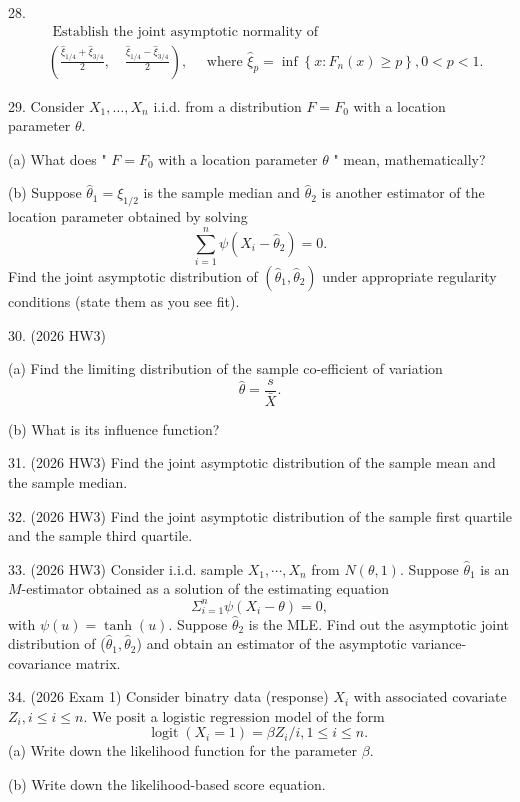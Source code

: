 \documentclass[11pt]{article}
\theoremstyle{definition}
\begin{document}
28.
$$
\begin{aligned}
&\text { Establish the joint asymptotic normality of }\\
&\left(\frac{\hat{\xi}_{1 / 4}+\hat{\xi}_{3 / 4}}{2}, \quad \frac{\hat{\xi}_{1 / 4}-\hat{\xi}_{3 / 4}}{2}\right), \quad \text { where } \hat{\xi}_p=\inf \left\{x: F_n(x) \geq p\right\}, 0<p<1 .
\end{aligned}
$$

29. Consider $X_1, \ldots, X_n$ i.i.d. from a distribution $F=F_0$ with a location parameter $\theta$.

(a) What does " $F=F_0$ with a location parameter $\theta$ " mean, mathematically?

(b) Suppose $\hat{\theta}_1=\xi_{1 / 2}$ is the sample median and $\hat{\theta}_2$ is another estimator of the location parameter obtained by solving
$$
\sum_{i=1}^n \psi\left(X_i-\hat{\theta}_2\right)=0 .
$$
Find the joint asymptotic distribution of $\left(\hat{\theta}_1, \hat{\theta}_2\right)$ under appropriate regularity conditions (state them as you see fit).

30. (2026 HW3) 

(a) Find the limiting distribution of the sample co-efficient of variation
$$
\widehat{\theta}=\frac{s}{\bar{X}} .
$$

(b) What is its influence function?

31. (2026 HW3) Find the joint asymptotic distribution of the sample mean and the sample median.

32. (2026 HW3) Find the joint asymptotic distribution of the sample first quartile and the sample third quartile.

33. (2026 HW3) Consider i.i.d. sample $X_1, \cdots, X_n$ from $N(\theta, 1)$. Suppose $\widehat{\theta}_1$ is an $M$-estimator obtained as a solution of the estimating equation
$$
\Sigma_{i=1}^n \psi\left(X_i-\theta\right)=0,
$$
with $\psi(u)=\tanh (u)$. Suppose $\widehat{\theta}_2$ is the MLE.
Find out the asymptotic joint distribution of ($\widehat{\theta}_1, \widehat{\theta}_2$) and obtain an estimator of the asymptotic variance-covariance matrix.

34. (2026 Exam 1) Consider binatry data (response) $X_i$ with associated covariate $Z_i, i \leq i \leq n$. We posit a logistic regression model of the form
$$
\operatorname{logit}\left(X_i=1\right)=\beta Z_i / i, 1 \leq i \leq n \text {. }
$$
(a) Write down the likelihood function for the parameter $\beta$.

(b) Write down the likelihood-based score equation.
\end{document}
